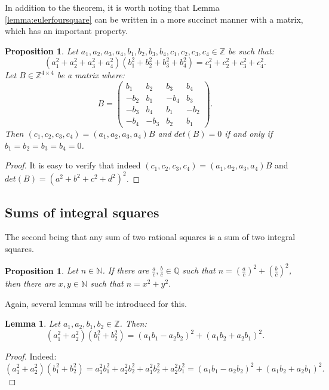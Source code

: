 \documentclass{report}
\newcommand{\N}{\mathbb{N}}
\newcommand{\Z}{\mathbb{Z}}
\newcommand{\Q}{\mathbb{Q}}
\newtheorem{lemma}[theorem]{Lemma}
\newtheorem{proposition}[theorem]{Proposition}
\theoremstyle{definition}\newtheorem*{definition}{Definition}
\theoremstyle{definition}\newtheorem*{example}{Example}
\theoremstyle{remark}\newtheorem*{remark}{Remark}
\begin{document}
In addition to the theorem, it is worth noting that Lemma \ref{lemma:eulerfoursquare} can be written in a more succinct manner with a matrix, which has an important property.

\begin{proposition}
\label{prop:foursquarematrix}
Let $ a_1, a_2, a_3, a_4, b_1, b_2, b_3, b_4, c_1, c_2, c_3, c_4 \in \Z $ be such that: $$ (a_1^2 + a_2^2 + a_3^2 + a_4^2) (b_1^2 + b_2^2 + b_3^2 + b_4^2) = c_1^2 + c_2^2 + c_3^2 + c_4^2. $$ Let $ B \in \Z^{4 \times 4} $ be a matrix where: $$ B = \begin{pmatrix} b_1 & b_2 & b_3 & b_4 \\ -b_2 & b_1 & -b_4 & b_3 \\ -b_3 & b_4 & b_1 & -b_2 \\ -b_4 & -b_3 & b_2 & b_1 \end{pmatrix}. $$ Then $ (c_1, c_2, c_3, c_4) = (a_1, a_2, a_3, a_4) B $ and $ det(B) = 0 $ if and only if $ b_1 = b_2 = b_3 = b_4 = 0 $.
\end{proposition}

\begin{proof}
It is easy to verify that indeed $ (c_1, c_2, c_3, c_4) = (a_1, a_2, a_3, a_4) B $ and $ det(B) = (a^2 + b^2 + c^2 + d^2)^2 $.
\end{proof}

\subsection{Sums of integral squares}

The second being that any sum of two rational squares is a sum of two integral squares.

\begin{proposition}
\label{prop:rationalintegersquare}
Let $ n \in \N $. If there are $ \frac{a}{c}, \frac{b}{c} \in \Q $ such that $ n = \left( \frac{a}{c} \right)^2 + \left( \frac{b}{c} \right)^2 $, then there are $ x, y \in \N $ such that $ n = x^2 + y^2 $.
\end{proposition}

Again, several lemmas will be introduced for this.

\begin{lemma}
\label{lemma:twosquareidentity}
Let $ a_1, a_2, b_1, b_2 \in \Z $. Then: $$ \left( a_1^2 + a_2^2 \right) \left( b_1^2 + b_2^2 \right) = (a_1 b_1 - a_2 b_2)^2 + (a_1 b_2 + a_2 b_1)^2. $$
\end{lemma}

\begin{proof}
Indeed: $$ \left( a_1^2 + a_2^2 \right) \left( b_1^2 + b_2^2 \right) = a_1^2 b_1^2 + a_2^2 b_2^2 + a_1^2 b_2^2 + a_2^2 b_1^2 = (a_1 b_1 - a_2 b_2)^2 + (a_1 b_2 + a_2 b_1)^2. $$
\end{proof}
\end{document}
